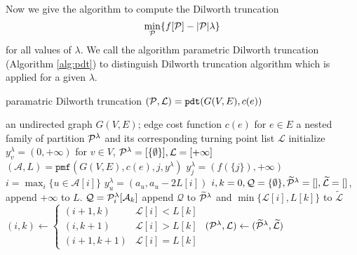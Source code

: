 \documentclass{article}
\begin{document}
Now we give the algorithm to compute the Dilworth truncation $$\min_{\P}\{f[\P] - \abs{\P} \lambda \}$$for all values of $\lambda$. We call the algorithm parametric Dilworth truncation (Algorithm \ref{alg:pdt}) to distinguish Dilworth truncation algorithm which is applied for a given $\lambda$.
\begin{algorithm}
\caption{paramatric Dilworth truncation $(\P, \mathcal{L})=\texttt{pdt}(G(V,E), c(e))$}\label{alg:pdt}
\begin{algorithmic}[1]
\REQUIRE an undirected graph $G(V, E)$; edge cost function $c(e)$ for $e\in E$
\ENSURE a nested family of partition $\P^{\lambda}$ and its corresponding turning point list $\mathcal{L}$
\STATE initialize $y^{\lambda}_v = (0, +\infty)$ for $ v \in V$, $\P^{\lambda} = [\{\emptyset\}], \mathcal{L} = [+\infty]$
\STATE  $(\mathcal{A}, L) = \texttt{pmf}(G(V,E), c(e), j, y^{\lambda})$
\STATE $y^{\lambda}_j = (f(\{j\}), +\infty)$
\ELSE
\STATE $ i = \max_i \{ u \in \mathcal{A}[i]\}$
\STATE $y_u^{\lambda} = (a_u, a_u - 2 L[i])$
\ENDIF
\ENDIF
\ENDFOR
\STATE $i, k = 0, \mathcal{Q} = \{\emptyset\}, \widetilde{\mathcal{\P}}^{\lambda} = [], \widetilde{\mathcal{L}} = []$, append $+\infty$ to $L$.
\STATE $\mathcal{Q} = \P^{\lambda}_i[\mathcal{A}_k]$
\STATE append $\mathcal{Q}$ to $\widetilde{\mathcal{\P}}^{\lambda}$ and $\min\{\mathcal{L}[i], L[k]\}$
to $\widetilde{\mathcal{L}}$
\ENDIF
\STATE $(i, k) \leftarrow \begin{cases} (i+1, k) & \mathcal{L}[i] < L[k] \\  (i, k+1) & \mathcal{L}[i] > L[k]\\ (i+1, k+1) & \mathcal{L}[i] = L[k]\end{cases}$
\ENDWHILE
\STATE $(\P^{\lambda}, \mathcal{L}) \leftarrow (\widetilde{\mathcal{\P}}^{\lambda},  \widetilde{\mathcal{L}})$
\ENDFOR
\end{algorithmic}
\end{algorithm}
\end{document}
